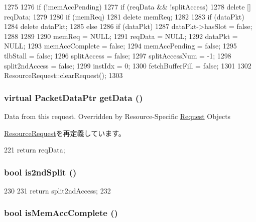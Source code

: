 \begin{DoxyCode}
1275 {
1276     if (!memAccPending) {
1277         if (reqData && !splitAccess)
1278             delete [] reqData;
1279 
1280         if (memReq)
1281             delete memReq;
1282 
1283         if (dataPkt)
1284             delete dataPkt;
1285     } else {
1286         if (dataPkt)
1287             dataPkt->hasSlot = false;
1288     }
1289 
1290     memReq = NULL;
1291     reqData = NULL;
1292     dataPkt = NULL;
1293     memAccComplete = false;
1294     memAccPending = false;
1295     tlbStall = false;
1296     splitAccess = false;
1297     splitAccessNum = -1;
1298     split2ndAccess = false;
1299     instIdx = 0;
1300     fetchBufferFill = false;
1301 
1302     ResourceRequest::clearRequest();
1303 }
\end{DoxyCode}
\hypertarget{classCacheRequest_a050fcb534c3978b1caf1556a4102e320}{
\subsubsection[{getData}]{\setlength{\rightskip}{0pt plus 5cm}virtual {\bf PacketDataPtr} getData ()}}
\label{classCacheRequest_a050fcb534c3978b1caf1556a4102e320}
Data from this request. Overridden by Resource-\/Specific \hyperlink{classRequest}{Request} Objects 

\hyperlink{classResourceRequest_a050fcb534c3978b1caf1556a4102e320}{ResourceRequest}を再定義しています。


\begin{DoxyCode}
221     { return reqData; }
\end{DoxyCode}
\hypertarget{classCacheRequest_af5773a400d8be1f558fb09c16a87df3f}{
\subsubsection[{is2ndSplit}]{\setlength{\rightskip}{0pt plus 5cm}bool is2ndSplit ()}}
\label{classCacheRequest_af5773a400d8be1f558fb09c16a87df3f}



\begin{DoxyCode}
230     {
231         return split2ndAccess;
232     }
\end{DoxyCode}
\hypertarget{classCacheRequest_a63ec568bcbc0ea1b45a4d351285768f0}{
\subsubsection[{isMemAccComplete}]{\setlength{\rightskip}{0pt plus 5cm}bool isMemAccComplete ()}}
\label{classCacheRequest_a63ec568bcbc0ea1b45a4d351285768f0}



